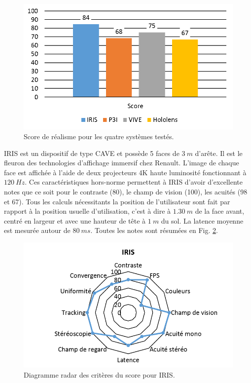\begin{figure}
	\renewcommand\thefigure{II}
	\centering
	\includegraphics[scale=1]{Figures/ResultatsScoreApplication}
	\caption{Score de réalisme pour les quatre systèmes testés.}
	\label{fig:resultats_score_application}
\end{figure}

\par IRIS est un dispositif de type CAVE et possède 5 faces de $3~m$ d'arête. Il est le fleuron des technologies d'affichage immersif chez Renault. L'image de chaque face est affichée à l'aide de deux projecteurs 4K haute luminosité fonctionnant à $120~Hz$. Ces caractéristiques hors-norme permettent à IRIS d'avoir d'excellente notes que ce soit pour le contraste (80), le champ de vision (100), les acuités (98 et 67). Tous les calculs nécessitants la position de l'utilisateur sont fait par rapport à la position usuelle d'utilisation, c'est à dire à $1.30~m$ de la face avant, centré en largeur et avec une hauteur de tête à $1~m$ du sol. La latence moyenne est mesurée autour de $80~ms$. Toutes les notes sont résumées en Fig. \ref{fig:radar_score_iris}.

\begin{figure}
	\renewcommand\thefigure{III}
	\centering
	\includegraphics[scale=1]{Figures/RadarScoreIRIS}
	\caption{Diagramme radar des critères du score pour IRIS.}
	\label{fig:radar_score_iris}
\end{figure}

